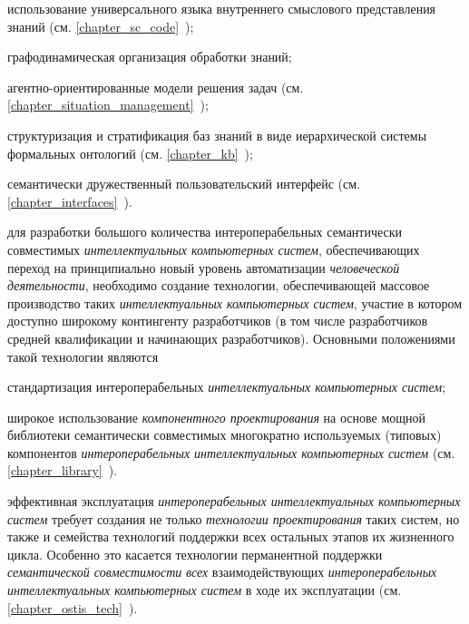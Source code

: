 \begin{textitemize}
\begin{textitemize}
		\item использование универсального языка внутреннего смыслового представления знаний (см. \ref{chapter_sc_code}~);
		\item графодинамическая организация обработки знаний;
		\item агентно-ориентированные модели решения задач (см. \ref{chapter_situation_management}~);
		\item структуризация и стратификация баз знаний в виде иерархической системы формальных онтологий (см. \ref{chapter_kb}~);
		\item семантически дружественный пользовательский интерфейс (см. \ref{chapter_interfaces}~).
	\end{textitemize}
	\item для разработки большого количества интероперабельных семантически совместимых \textit{интеллектуальных компьютерных систем}, обеспечивающих переход на принципиально новый уровень автоматизации \textit{человеческой деятельности}, необходимо создание технологии, обеспечивающей массовое производство таких \textit{интеллектуальных компьютерных систем}, участие в котором доступно широкому контингенту разработчиков (в том числе разработчиков средней квалификации и начинающих разработчиков). Основными положениями такой технологии являются
	\begin{textitemize}
		\item стандартизация интероперабельных \textit{интеллектуальных компьютерных систем};
		\item широкое использование \textit{компонентного проектирования} на основе мощной библиотеки семантически совместимых многократно используемых (типовых) компонентов \textit{интероперабельных интеллектуальных компьютерных систем} (см. \ref{chapter_library}~).
	\end{textitemize}
	\item эффективная эксплуатация \textit{интероперабельных интеллектуальных компьютерных систем} требует создания не только \textit{технологии проектирования} таких систем, но также и семейства технологий поддержки всех остальных этапов их жизненного цикла. Особенно это касается технологии перманентной поддержки \textit{семантической совместимости} \textit{всех} взаимодействующих \textit{интероперабельных интеллектуальных компьютерных систем} в ходе их эксплуатации (см. \ref{chapter_ostis_tech}~).
\end{textitemize}

%